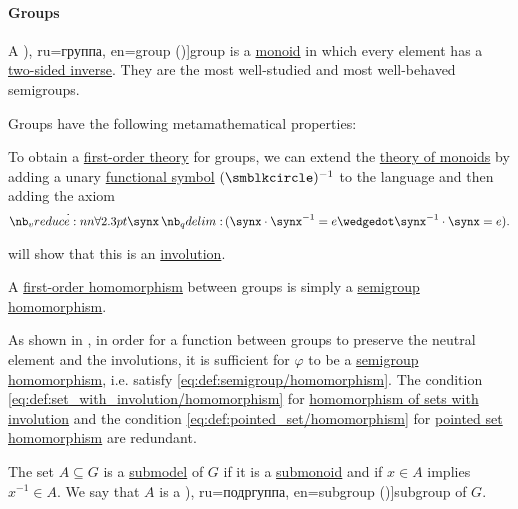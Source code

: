 \paragraph{Groups}

\begin{definition}\label{def:group}
  A \term[bg=група (\cite[372]{Обрешков1962ВисшаАлгебра}), ru=группа, en=group (\cite[49]{Jacobson1985BasicAlgebraI})]{group} is a \hyperref[def:monoid]{monoid} in which every element has a \hyperref[def:monoid_inverse]{two-sided inverse}. They are the most well-studied and most well-behaved semigroups.

  Groups have the following metamathematical properties:
  \begin{thmenum}
    \mimprovised To obtain a \hyperref[def:first_order_theory]{first-order theory} for groups, we can extend the \hyperref[def:monoid/theory]{theory of monoids} by adding a unary \hyperref[def:first_order_language/fun]{functional symbol} \( (\anon)^{-1} \) to the language and then adding the axiom
    \begin{equation}\label{eq:def:group/theory/inverse_axiom}
      \qforall \synx (\synx \cdot \synx^{-1} = e \synwedge \synx^{-1} \cdot \synx = e).
    \end{equation}

     will show that this is an \hyperref[def:morphism_invertibility/involution]{involution}.

    \mimprovised A \hyperref[def:first_order_homomorphism]{first-order homomorphism} between groups is simply a \hyperref[def:semigroup/homomorphism]{semigroup homomorphism}.

    As shown in , in order for a function between groups to preserve the neutral element and the involutions, it is sufficient for \( \varphi \) to be a \hyperref[def:semigroup/homomorphism]{semigroup homomorphism}, i.e. satisfy \eqref{eq:def:semigroup/homomorphism}. The condition \eqref{eq:def:set_with_involution/homomorphism} for \hyperref[def:set_with_involution/homomorphism]{homomorphism of sets with involution} and the condition \eqref{eq:def:pointed_set/homomorphism} for \hyperref[def:pointed_set/homomorphism]{pointed set homomorphism} are redundant.

     The set \( A \subseteq G \) is a \hyperref[def:first_order_submodel]{submodel} of \( G \) if it is a \hyperref[def:monoid/submodel]{submonoid} and if \( x \in A \) implies \( x^{-1} \in A \). We say that \( A \) is a \term[bg=подгрупа (\cite[378]{Обрешков1962ВисшаАлгебра}), ru=подргуппа, en=subgroup (\cite[49]{Jacobson1985BasicAlgebraI})]{subgroup} of \( G \).


\end{thmenum}
\end{definition}
